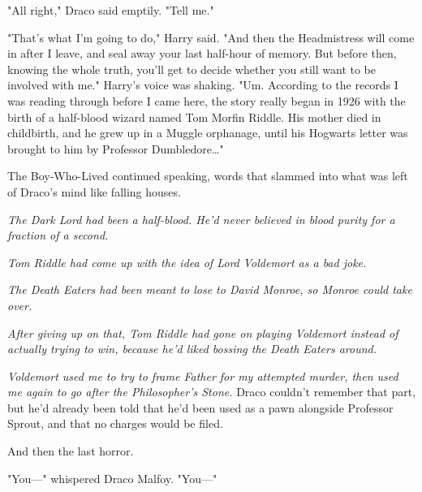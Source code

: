 "All right," Draco said emptily. "Tell me."

"That's what I'm going to do," Harry said. "And then the Headmistress will come
in after I leave, and seal away your last half-hour of memory. But before then,
knowing the whole truth, you'll get to decide whether you still want to be
involved with me." Harry's voice was shaking. "Um. According to the records I
was reading through before I came here, the story really began in 1926 with the
birth of a half-blood wizard named Tom Morfin Riddle. His mother died in
childbirth, and he grew up in a Muggle orphanage, until his Hogwarts letter was
brought to him by Professor Dumbledore{\ldots}"

The Boy-Who-Lived continued speaking, words that slammed into what was left of
Draco's mind like falling houses.

\emph{The Dark Lord had been a half-blood. He'd never believed in blood purity
for a fraction of a second.}

\emph{Tom Riddle had come up with the idea of Lord Voldemort as a bad joke.}

\emph{The Death Eaters had been meant to lose to David Monroe, so Monroe could
take over.}

\emph{After giving up on that, Tom Riddle had gone on playing Voldemort instead
of actually trying to win, because he'd liked bossing the Death Eaters around.}

\emph{Voldemort used me to try to frame Father for my attempted murder, then
used me again to go after the Philosopher's Stone.} Draco couldn't remember
that part, but he'd already been told that he'd been used as a pawn alongside
Professor Sprout, and that no charges would be filed.

And then the last horror.

"You---" whispered Draco Malfoy. "You---"

